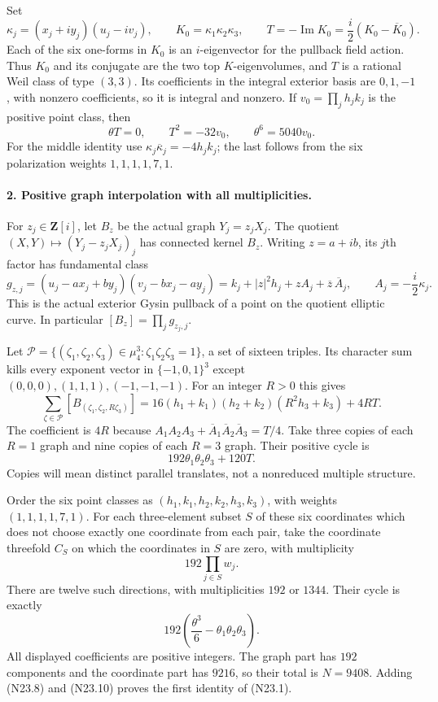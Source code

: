 Set
\[
 \kappa_j=(x_j+i y_j)(u_j-i v_j),\qquad
 K_0=\kappa_1\kappa_2\kappa_3,\qquad
                  T=-\operatorname{Im}K_0
                    =\frac{i}{2}(K_0-\overline K_0).          \tag{N23.4}
\]
Each of the six one-forms in $K_0$ is an $i$-eigenvector for
the pullback field action. Thus $K_0$ and its conjugate are
the two top $K$-eigenvolumes, and $T$ is a rational Weil class
of type $(3,3)$. Its coefficients in the integral exterior basis
are $0,1,-1$, with nonzero coefficients, so it is integral and
nonzero. If $v_0=\prod_jh_jk_j$ is the positive point class, then
\[
 \theta T=0,\qquad T^2=-32v_0,\qquad\theta^6=5040v_0.
                                                               \tag{N23.5}
\]
For the middle identity use
$\kappa_j\overline\kappa_j=-4h_jk_j$; the last follows from
the six polarization weights $1,1,1,1,7,1$.

\paragraph{2. Positive graph interpolation with all multiplicities.}
For $z_j\in\mathbf Z[i]$, let $B_z$ be the actual graph
$Y_j=z_jX_j$. The quotient
$(X,Y)\mapsto(Y_j-z_jX_j)_j$ has connected kernel $B_z$.
Writing $z=a+ib$, its $j$th factor has fundamental class
\[
 g_{z,j}=(u_j-a x_j+b y_j)(v_j-b x_j-a y_j)
       =k_j+|z|^2h_j+z A_j+\overline z\,\overline A_j,
 \qquad A_j=-\frac{i}{2}\kappa_j.                            \tag{N23.6}
\]
This is the actual exterior Gysin pullback of a point on the
quotient elliptic curve. In particular $[B_z]=\prod_jg_{z_j,j}$.

Let $\mathcal P=\{(\zeta_1,\zeta_2,\zeta_3)\in\mu_4^3:
\zeta_1\zeta_2\zeta_3=1\}$, a set of sixteen triples.
Its character sum kills every exponent vector in
$\{-1,0,1\}^3$ except $(0,0,0),(1,1,1),(-1,-1,-1)$.
For an integer $R>0$ this gives
\[
 \sum_{\zeta\in\mathcal P}[B_{(\zeta_1,\zeta_2,R\zeta_3)}]
 =16(h_1+k_1)(h_2+k_2)(R^2h_3+k_3)+4R T.                  \tag{N23.7}
\]
The coefficient is $4R$ because
$A_1A_2A_3+\overline A_1\overline A_2\overline A_3=T/4$.
Take three copies of each $R=1$ graph and nine copies of each
$R=3$ graph. Their positive cycle is
\[
                       192\theta_1\theta_2\theta_3+120T.   \tag{N23.8}
\]
Copies will mean distinct parallel translates, not a nonreduced
multiple structure.

Order the six point classes as
$(h_1,k_1,h_2,k_2,h_3,k_3)$, with weights $(1,1,1,1,7,1)$.
For each three-element subset $S$ of these six coordinates
which does not choose exactly one coordinate from each pair,
take the coordinate threefold $C_S$ on which the coordinates
in $S$ are zero, with multiplicity
\[
                         192\prod_{j\in S}w_j.             \tag{N23.9}
\]
There are twelve such directions, with multiplicities $192$
or $1344$. Their cycle is exactly
\[
                 192\left(\frac{\theta^3}{6}
                                -\theta_1\theta_2\theta_3\right).
                                                               \tag{N23.10}
\]
All displayed coefficients are positive integers. The graph
part has $192$ components and the coordinate part has $9216$,
so their total is $N=9408$. Adding (N23.8) and (N23.10)
proves the first identity of (N23.1).

